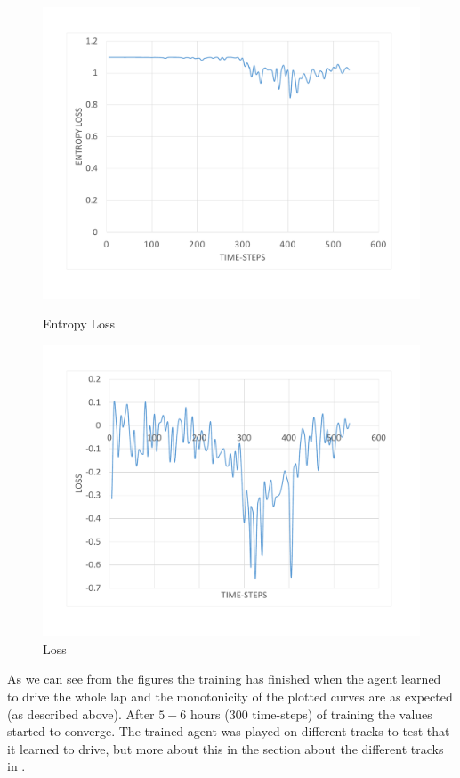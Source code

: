 \begin{figure}[H]
	\advance\leftskip-2cm
	\includegraphics[width=\linewidth]{Figures/EntropyLoss}
	\caption{Entropy Loss}\label{fig:EntropyLoss}
	\endminipage\hfill
	\includegraphics[width=\linewidth]{Figures/Loss}
	\caption{Loss}\label{fig:Loss}
	\endminipage
\end{figure}
As we can see from the figures the training has finished when the agent learned to drive the whole lap and the monotonicity of the plotted curves are as expected (as described above). After $5-6$ hours ($300$ time-steps) of training the values started to converge. The trained agent was played on different tracks to test that it learned to drive, but more about this in the section about the different tracks in .

